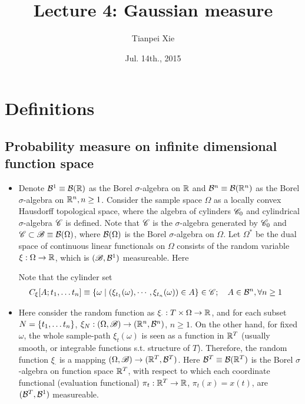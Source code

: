 \documentclass[11pt]{article}
\begin{document}
\title{Lecture 4: Gaussian measure}
\author{ Tianpei Xie}
\date{ Jul. 14th., 2015 }
\maketitle
\tableofcontents
\newpage
\section{Definitions}
\subsection{Probability measure on infinite dimensional function space}
\begin{itemize}
\item Denote ${\mathcal B}^{1}\equiv {\mathcal B}({\mathbb R})$ as the Borel $\sigma$-algebra on ${\mathbb R}$ and  ${\mathcal B}^{n}\equiv {\mathcal B}({\mathbb R}^{n})$ as the Borel $\sigma$-algebra on ${\mathbb R}^{n}, n\ge 1$.  Consider the sample space $\Omega$ as a locally convex Hausdorff topological space, where the algebra of cylinders ${\mathscr C}_{0}$ and cylindrical $\sigma$-algebra ${\mathscr C}$ is defined. Note that ${\mathscr C}$ is the $\sigma$-algebra generated by ${\mathscr C}_{0}$ and ${\mathscr C} \subset {\mathscr B}\equiv {\mathcal B}(\Omega)$, where ${\mathcal B}(\Omega)$ is the Borel $\sigma$-algebra on $\Omega$.  Let $\Omega^{*}$ be the dual space of continuous linear functionals on $\Omega$ consists of the random variable $\xi: \Omega\rightarrow {\mathbb R}$, which is $({\mathscr B}, {\mathcal B}^{1})$ measureable.  Here 

Note that the cylinder set 
\begin{align*}
C_{\xi}[A; t_{1},\ldots t_{n}] &\equiv \left\{\omega\;|\; (\xi_{t_{1}}(\omega), \cdots, \xi_{t_{n}}(\omega)) \in A \right\} \in {\mathscr C}; \quad A\in {\mathcal B}^{n}, \forall n\ge 1
\end{align*}

\item Here consider the random function as $\xi_{\cdot}: T\times \Omega  \rightarrow {\mathbb R}$, and for each subset $N = \left\{t_{1},\ldots t_{n}\right\}$, $\xi_{N}: (\Omega, {\mathscr B} ) \rightarrow ({\mathbb R}^{n}, {\mathcal B}^{n})$, $n\ge 1$.  On the other hand, for fixed $\omega$,  the whole sample-path $\xi_{t}(\omega)$ is seen as a function in ${\mathbb R}^{T}$  (usually smooth, or integrable functions s.t. structure of $T$). Therefore, the random function $\xi_{\cdot}$ is a mapping $(\Omega, {\mathscr B}) \rightarrow ({\mathbb R}^{T},  {\mathcal B}^{T})$. Here ${\mathcal B}^{T}\equiv {\mathcal B}({\mathbb R}^{T})$ is the Borel $\sigma$-algebra on function space ${\mathbb R}^{T}$, with respect to which each coordinate functional (evaluation functional) $\pi_{t}: {\mathbb R}^{T}\rightarrow {\mathbb R}$, $\pi_{t}(x) = x(t)$, are $({\mathcal B}^{T}, {\mathcal B}^{1})$ measureable. 


\end{itemize}
\end{document}
